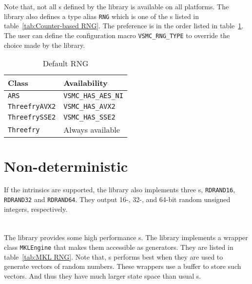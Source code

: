 Note that, not all \rng{}s defined by the library is available on all
platforms. The library also defines a type alias \verb|RNG| which is one of the
\rng{}s listed in table~\ref{tab:Counter-based RNG}. The preference is in the
order listed in table~\ref{tab:Default RNG}. The user can define the
configuration macro \verb|VSMC_RNG_TYPE| to override the choice made by the
library.

\begin{table}
  \begin{tabularx}{\textwidth}{XX}
    \toprule
    Class & Availability \\
    \midrule
    \verb|ARS|          & \verb|VSMC_HAS_AES_NI| \\
    \verb|ThreefryAVX2| & \verb|VSMC_HAS_AVX2|   \\
    \verb|ThreefrySSE2| & \verb|VSMC_HAS_SSE2|   \\
    \verb|Threefry|     & Always available       \\
    \bottomrule
  \end{tabularx}
  \caption{Default RNG}
  \label{tab:Default RNG}
\end{table}

\section{Non-deterministic \protect\rng}
\label{sec:Non-deterministic RNG}

If the \rdrand intrinsics are supported, the library also implements three
\rng{}s, \verb|RDRAND16|, \verb|RDRAND32| and \verb|RDRAND64|. They output 16-,
32-, and 64-bit random unsigned integers, respectively.

\section{\protect\mkl{} \protect\rng}
\label{sec:MKL RNG}

The \mkl library provides some high performance \rng{}s. The library implements
a wrapper class \verb|MKLEngine| that makes them accessible as \cppoo{}
generators. They are listed in table~\ref{tab:MKL RNG}. Note that, \mkl{}
\rng{}s performs best when they are used to generate vectors of random numbers.
These wrappers use a buffer to store such vectors. And thus they have much
larger state space than usual \rng{}s.

